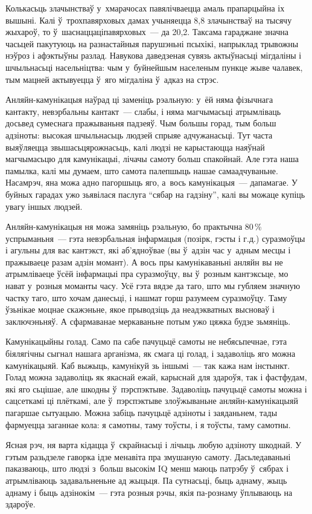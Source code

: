 Колькасьць злачынстваў у~хмарачосах павялічваецца амаль прапарцыйна іх вышыні. Калі ў~трохпавярховых дамах учыняецца 8,8 злачынстваў на тысячу жыхароў, то ў~шаснаццаціпавярховых~--- да 20,2. Таксама гараджане значна часьцей пакутуюць на разнастайныя парушэньні псыхікі, напрыклад трывожны нэўроз і афэктыўны разлад. Навукова даведзеная сувязь актыўнасьці мігдаліны і шчыльнасьці насельніцтва: чым у~буйнейшым населеным пункце жыве чалавек, тым мацней актывуецца ў~яго мігдаліна ў~адказ на стрэс.

Анляйн-камунікацыя наўрад ці заменіць рэальную: у~ёй няма фізычнага кантакту, невэрбальны кантакт~--- слабы, і няма магчымасьці атрымліваць досьвед сумеснага пражываньня падзеяў. Чым большы горад, тым больш адзіноты: высокая шчыльнасьць людзей спрыяе адчужанасьці. Тут часта выяўляецца звышасьцярожнасьць, калі людзі не карыстаюцца наяўнай магчымасьцю для камунікацыі, лічачы самоту больш спакойнай. Але гэта наша памылка, калі мы думаем, што самота палепшыць нашае самаадчуваньне. Насамрэч, яна можа адно пагоршыць яго, а~вось камунікацыя~--- дапамагае. У буйных гарадах ужо зьявілася паслуга ``сябар на гадзіну'', калі вы можаце купіць увагу іншых людзей.

Анляйн-камунікацыя ня можа замяніць рэальную, бо практычна 80\,\% успрыманьня~--- гэта невэрбальная інфармацыя (позірк, гэсты і г.д.) суразмоўцы і агульны для вас кантэкст, які аб'ядноўвае (вы ў~адзін час у~адным месцы і пражываеце разам адзін момант). А вось пры камунікаваньні анляйн вы не атрымліваеце ўсёй інфармацыі пра суразмоўцу, вы ў~розным кантэксьце, мо нават у~розныя моманты часу. Усё гэта вядзе да таго, што мы губляем значную частку таго, што хочам данесьці, і нашмат горш разумеем суразмоўцу. Таму ўзьнікае моцнае скажэньне, якое прыводзіць да неадэкватных высноваў і заключэньняў. А сфармаванае меркаваньне потым ужо цяжка будзе зьмяніць.

Камунікацыйны голад. Само па сабе пачуцьцё самоты не небясьпечнае, гэта біялягічны сыгнал нашага арганізма, як смага ці голад, і задаволіць яго можна камунікацыяй. Каб выжыць, камунікуй зь іншымі~--- так кажа нам інстынкт. Голад можна задаволіць як якаснай ежай, карыснай для здароўя, так і фастфудам, які яго сьцішае, але шкодны ў~пэрспэктыве. Задаволіць пачуцьцё самоты можна і сацсеткамі ці плёткамі, але ў~пэрспэктыве злоўжываньне анляйн-камунікацыяй пагаршае сытуацыю. Можна забіць пачуцьцё адзіноты і заяданьнем, тады фармуецца заганнае кола: я самотны, таму тоўсты, і я тоўсты, таму самотны.

Ясная рэч, ня варта кідацца ў~скрайнасьці і лічыць любую адзіноту шкоднай. У гэтым разьдзеле гаворка ідзе менавіта пра змушаную самоту. Дасьледаваньні паказваюць, што людзі з~больш высокім IQ менш маюць патрэбу ў~сябрах і атрымліваюць задавальненьне ад жыцьця. Па сутнасьці, быць аднаму, жыць аднаму і быць адзінокім~--- гэта розныя рэчы, якія па-рознаму ўплываюць на здароўе.

